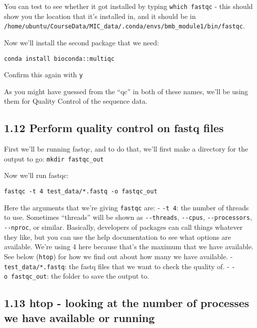 \documentclass[
]{book}
\begin{document}
You can test to see whether it got installed by typing \texttt{which\ fastqc} - this should show you the location that it's installed in, and it should be in \texttt{/home/ubuntu/CourseData/MIC\_data/.conda/envs/bmb\_module1/bin/fastqc}.

Now we'll install the second package that we need:

\begin{verbatim}
conda install bioconda::multiqc
\end{verbatim}

Confirm this again with \texttt{y}

As you might have guessed from the ``qc'' in both of these names, we'll be using them for Quality Control of the sequence data.

\subsection{1.12 Perform quality control on fastq files}\label{perform-quality-control-on-fastq-files}

First we'll be running fastqc, and to do that, we'll first make a directory for the output to go: \texttt{mkdir\ fastqc\_out}

Now we'll run fastqc:

\begin{verbatim}
fastqc -t 4 test_data/*.fastq -o fastqc_out
\end{verbatim}

Here the arguments that we're giving \texttt{fastqc} are:
- \texttt{-t\ 4}: the number of threads to use. Sometimes ``threads'' will be shown as \texttt{-\/-threads}, \texttt{-\/-cpus}, \texttt{-\/-processors}, \texttt{-\/-nproc}, or similar. Basically, developers of packages can call things whatever they like, but you can use the help documentation to see what options are available. We're using 4 here because that's the maximum that we have available. See below (\texttt{htop}) for how we find out about how many we have available.
- \texttt{test\_data/*.fastq}: the fastq files that we want to check the quality of.
- \texttt{-o\ fastqc\_out}: the folder to save the output to.

\subsection{1.13 htop - looking at the number of processes we have available or running}\label{htop---looking-at-the-number-of-processes-we-have-available-or-running}
\end{document}

